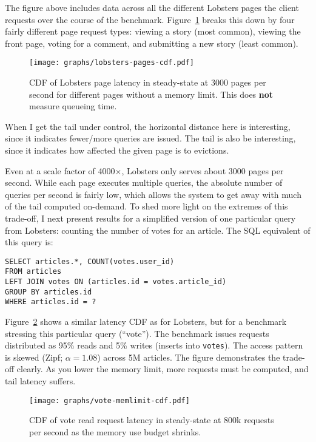 The figure above includes data across all the different Lobsters pages the
client requests over the course of the benchmark.
Figure~\ref{f:lobsters-pages-latency} breaks this down by four fairly
different page request types: viewing a story (most common), viewing the front
page, voting for a comment, and submitting a new story (least common).

\begin{figure}[h]
  \centering
  \texttt{[image: graphs/lobsters-pages-cdf.pdf]}
  \caption{CDF of Lobsters page latency in steady-state at 3000 pages per second
  for different pages without a memory limit. This does \textbf{not} measure
  queueing time.}
  \label{f:lobsters-pages-latency}
\end{figure}

\begin{inprogress}
  When I get the tail under control, the horizontal distance here is
  interesting, since it indicates fewer/more queries are issued. The tail is
  also be interesting, since it indicates how affected the given page is to
  evictions.
\end{inprogress}

Even at a scale factor of 4000$\times$, Lobsters only serves about 3000 pages
per second. While each page executes multiple queries, the absolute number of
queries per second is fairly low, which allows the system to get away with much
of the tail computed on-demand. To shed more light on the extremes of this
trade-off, I next present results for a simplified version of one particular
query from Lobsters: counting the number of votes for an article. The SQL
equivalent of this query is:

\begin{verbatim}
SELECT articles.*, COUNT(votes.user_id)
FROM articles
LEFT JOIN votes ON (articles.id = votes.article_id)
GROUP BY articles.id
WHERE articles.id = ?
\end{verbatim}

Figure~\ref{f:vote-mem-latency} shows a similar latency CDF as for Lobsters, but
for a benchmark stressing this particular query (``vote''). The benchmark issues
requests distributed as 95\% reads and 5\% writes (inserts into \texttt{votes}).
The access pattern is skewed (Zipf; $\alpha = 1.08$) across 5M articles. The
figure demonstrates the trade-off clearly. As you lower the memory limit, more
requests must be computed, and tail latency suffers.

\begin{figure}[h]
  \centering
  \texttt{[image: graphs/vote-memlimit-cdf.pdf]}
  \caption{CDF of vote read request latency in steady-state at 800k requests per
  second as the memory use budget shrinks.}
  \label{f:vote-mem-latency}
\end{figure}

